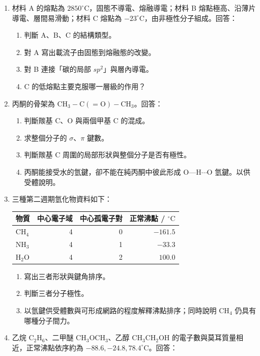 \documentclass[11pt,a4paper]{article}
\newcounter{none}
\providecommand{\tightlist}{%
  \setlength{\itemsep}{0pt}\setlength{\parskip}{0pt}}
\begin{document}
\begin{enumerate}
\def\labelenumi{\arabic{enumi}.}
\setcounter{enumi}{12}
\item
  材料 A 的熔點為 \(2850^\circ\mathrm C\)，固態不導電、熔融導電；材料 B 熔點極高、沿薄片導電、層間易滑動；材料 C 熔點為 \(-23^\circ\mathrm C\)，由非極性分子組成。回答：

  \begin{enumerate}
  \def\labelenumii{\arabic{enumii}.}
  \tightlist
  \item
    判斷 A、B、C 的結構類型。
  \item
    對 A 寫出載流子由固態到熔融態的改變。
  \item
    對 B 連接「碳的局部 \(sp^2\)」與層內導電。
  \item
    C 的低熔點主要克服哪一層級的作用？
  \end{enumerate}
\item
  丙酮的骨架為 \(\mathrm{CH_3-C(=O)-CH_3}\)。回答：

  \begin{enumerate}
  \def\labelenumii{\arabic{enumii}.}
  \tightlist
  \item
    判斷羰基 C、O 與兩個甲基 C 的混成。
  \item
    求整個分子的 \(\sigma\)、\(\pi\) 鍵數。
  \item
    判斷羰基 C 周圍的局部形狀與整個分子是否有極性。
  \item
    丙酮能接受水的氫鍵，卻不能在純丙酮中彼此形成 O---H\(\cdots\)O 氫鍵。以供受體說明。
  \end{enumerate}
\item
  三種第二週期氫化物資料如下：

  {\def\LTcaptype{none} %
  \begin{longtable}[]{@{}lrrr@{}}
  \toprule\noalign{}
  物質 & 中心電子域 & 中心孤電子對 & 正常沸點 / \(^\circ\mathrm C\) \\
  \midrule\noalign{}
  \endhead
  \bottomrule\noalign{}
  \endlastfoot
  CH\(_4\) & 4 & 0 & \(-161.5\) \\
  NH\(_3\) & 4 & 1 & \(-33.3\) \\
  H\(_2\)O & 4 & 2 & \(100.0\) \\
  \end{longtable}
  }

  \begin{enumerate}
  \def\labelenumii{\arabic{enumii}.}
  \tightlist
  \item
    寫出三者形狀與鍵角排序。
  \item
    判斷三者分子極性。
  \item
    以氫鍵供受體數與可形成網路的程度解釋沸點排序；同時說明 CH\(_4\) 仍具有哪種分子間力。
  \end{enumerate}
\item
  乙烷 C\(_2\)H\(_6\)、二甲醚 CH\(_3\)OCH\(_3\)、乙醇 CH\(_3\)CH\(_2\)OH 的電子數與莫耳質量相近，正常沸點依序約為 \(-88.6,-24.8,78.4^\circ\mathrm C\)。回答：


\end{enumerate}
\end{document}
